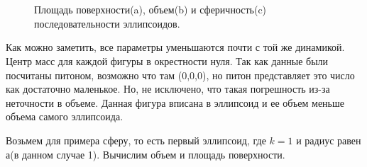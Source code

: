 \begin{figure}[H]
	\centering
	\label{fig:B}
	\\
	 \\
	\caption{Площадь поверхности(a), объем(b) и сферичность(c) последовательности эллипсоидов.}
\end{figure}

Как можно заметить, все параметры уменьшаются почти с той же динамикой. Центр масс для каждой фигуры в окрестности нуля. Так как данные были посчитаны питоном, возможно что там (0,0,0), но питон представляет это число как достаточно маленькое. Но, не исключено, что такая погрешность из-за неточности в объеме. Данная фигура вписана в эллипсоид и ее объем меньше объема самого эллипсоида.

Возьмем для примера сферу, то есть первый эллипсоид, где $ k = 1$ и радиус равен а(в данном случае 1). Вычислим объем и площадь поверхности. 

